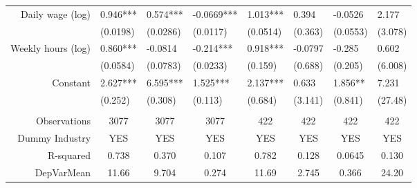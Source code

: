 \begin{tabular}{rrrrrrrr}
Daily wage (log) & \multicolumn{1}{l}{0.946***} & \multicolumn{1}{l}{0.574***} & \multicolumn{1}{l}{-0.0669***} & \multicolumn{1}{l}{1.013***} & \multicolumn{1}{l}{0.394} & \multicolumn{1}{l}{-0.0526} & \multicolumn{1}{l}{2.177} \\
      & \multicolumn{1}{l}{(0.0198)} & \multicolumn{1}{l}{(0.0286)} & \multicolumn{1}{l}{(0.0117)} & \multicolumn{1}{l}{(0.0514)} & \multicolumn{1}{l}{(0.363)} & \multicolumn{1}{l}{(0.0553)} & \multicolumn{1}{l}{(3.078)} \\
Weekly hours (log) & \multicolumn{1}{l}{0.860***} & \multicolumn{1}{l}{-0.0814} & \multicolumn{1}{l}{-0.214***} & \multicolumn{1}{l}{0.918***} & \multicolumn{1}{l}{-0.0797} & \multicolumn{1}{l}{-0.285} & \multicolumn{1}{l}{0.602} \\
      & \multicolumn{1}{l}{(0.0584)} & \multicolumn{1}{l}{(0.0783)} & \multicolumn{1}{l}{(0.0233)} & \multicolumn{1}{l}{(0.159)} & \multicolumn{1}{l}{(0.688)} & \multicolumn{1}{l}{(0.205)} & \multicolumn{1}{l}{(6.008)} \\
Constant & \multicolumn{1}{l}{2.627***} & \multicolumn{1}{l}{6.595***} & \multicolumn{1}{l}{1.525***} & \multicolumn{1}{l}{2.137***} & \multicolumn{1}{l}{0.633} & \multicolumn{1}{l}{1.856**} & \multicolumn{1}{l}{7.231} \\
      & \multicolumn{1}{l}{(0.252)} & \multicolumn{1}{l}{(0.308)} & \multicolumn{1}{l}{(0.113)} & \multicolumn{1}{l}{(0.684)} & \multicolumn{1}{l}{(3.141)} & \multicolumn{1}{l}{(0.841)} & \multicolumn{1}{l}{(27.48)} \\
      &       &       &       &       &       &       &  \\
      \midrule
Observations & \multicolumn{1}{c}{3077} & \multicolumn{1}{c}{3077} & \multicolumn{1}{c}{3077} & \multicolumn{1}{c}{422} & \multicolumn{1}{c}{422} & \multicolumn{1}{c}{422} & \multicolumn{1}{c}{422} \\
Dummy Industry & \multicolumn{1}{c}{YES} & \multicolumn{1}{c}{YES} & \multicolumn{1}{c}{YES} & \multicolumn{1}{c}{YES} & \multicolumn{1}{c}{YES} & \multicolumn{1}{c}{YES} & \multicolumn{1}{c}{YES} \\
R-squared & \multicolumn{1}{c}{0.738} & \multicolumn{1}{c}{0.370} & \multicolumn{1}{c}{0.107} & \multicolumn{1}{c}{0.782} & \multicolumn{1}{c}{0.128} & \multicolumn{1}{c}{0.0645} & \multicolumn{1}{c}{0.130} \\
DepVarMean & \multicolumn{1}{c}{11.66} & \multicolumn{1}{c}{9.704} & \multicolumn{1}{c}{0.274} & \multicolumn{1}{c}{11.69} & \multicolumn{1}{c}{2.745} & \multicolumn{1}{c}{0.366} & \multicolumn{1}{c}{24.20} \\
\bottomrule
\bottomrule
\end{tabular}%
